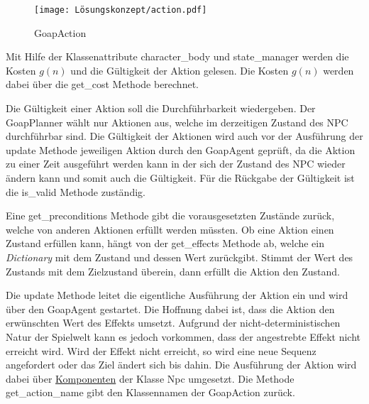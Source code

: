 \begin{figure}[h]
  \centering
  \texttt{[image: Lösungskonzept/action.pdf]}
	\captionsetup{justification=justified, format=plain}
  \caption{GoapAction}
  \label{fig:GoapAction}
\end{figure}

Mit Hilfe der Klassenattribute character\_body und state\_manager werden die Kosten $g(n)$ und die Gültigkeit der Aktion gelesen. Die Kosten $g(n)$ werden dabei über die get\_cost Methode berechnet.

Die Gültigkeit einer Aktion soll die Durchführbarkeit wiedergeben. Der GoapPlanner wählt nur Aktionen aus, welche im derzeitigen Zustand des NPC durchführbar sind. Die Gültigkeit der Aktionen wird auch vor der Ausführung der update Methode jeweiligen Aktion durch den GoapAgent geprüft, da die Aktion zu einer Zeit ausgeführt werden kann in der sich der Zustand des NPC wieder ändern kann und somit auch die Gültigkeit. Für die Rückgabe der Gültigkeit ist die is\_valid Methode zuständig.

Eine get\_preconditions Methode gibt die vorausgesetzten Zustände zurück, welche von anderen Aktionen erfüllt werden müssten. Ob eine Aktion einen Zustand erfüllen kann, hängt von der get\_effects Methode ab, welche ein \textit{Dictionary} mit dem Zustand und dessen Wert zurückgibt. Stimmt der Wert des Zustands mit dem Zielzustand überein, dann erfüllt die Aktion den Zustand.

Die update Methode leitet die eigentliche Ausführung der Aktion ein und wird über den GoapAgent gestartet. Die Hoffnung dabei ist, dass die Aktion den erwünschten Wert des Effekts umsetzt. Aufgrund der nicht-deterministischen Natur der Spielwelt kann es jedoch vorkommen, dass der angestrebte Effekt nicht erreicht wird. Wird der Effekt nicht erreicht, so wird eine neue Sequenz angefordert oder das Ziel ändert sich bis dahin. Die Ausführung der Aktion wird dabei über \hyperref[chap:game-objects]{Komponenten} der Klasse Npc umgesetzt. Die Methode get\_action\_name gibt den Klassennamen der GoapAction zurück.


